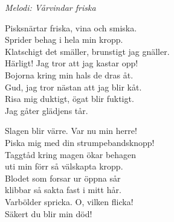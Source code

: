 {\footnotesize\textit{Melodi: Vårvindar friska}}\par
\vspace{10pt}
Pisksnärtar friska, vina och smiska.\\
Sprider behag i hela min kropp.\\
Klatschigt det smäller, brunstigt jag gnäller.\\
Härligt! Jag tror att jag kastar opp!\\
Bojorna kring min hals de dras åt.\\
Gud, jag tror nästan att jag blir kåt.\\
Risa mig duktigt, ögat blir fuktigt.\\
Jag gåter glädjens tår.\par
\vspace{10pt}
Slagen blir värre. Var nu min herre!\\
Piska mig med din strumpebandsknopp!\\
Taggtåd kring magen ökar behagen\\
uti min förr så välskapta kropp.\\
Blodet som forsar ur öppna sår\\
klibbar så sakta fast i mitt hår.\\
Varbölder spricka. O, vilken flicka!\\
Säkert du blir min död!
